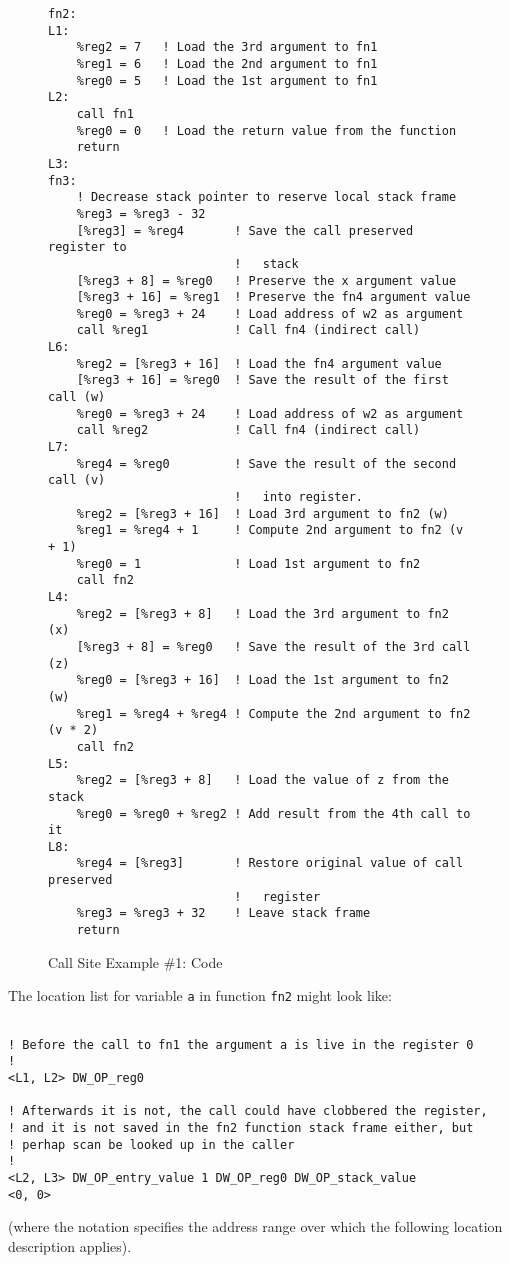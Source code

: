 \begin{figure}[ht]
\begin{lstlisting}
fn2:
L1:
    %reg2 = 7   ! Load the 3rd argument to fn1
    %reg1 = 6   ! Load the 2nd argument to fn1
    %reg0 = 5   ! Load the 1st argument to fn1
L2:
    call fn1
    %reg0 = 0   ! Load the return value from the function
    return
L3:
fn3:
    ! Decrease stack pointer to reserve local stack frame
    %reg3 = %reg3 - 32
    [%reg3] = %reg4       ! Save the call preserved register to
                          !   stack
    [%reg3 + 8] = %reg0   ! Preserve the x argument value
    [%reg3 + 16] = %reg1  ! Preserve the fn4 argument value
    %reg0 = %reg3 + 24    ! Load address of w2 as argument
    call %reg1            ! Call fn4 (indirect call)
L6:
    %reg2 = [%reg3 + 16]  ! Load the fn4 argument value
    [%reg3 + 16] = %reg0  ! Save the result of the first call (w)
    %reg0 = %reg3 + 24    ! Load address of w2 as argument
    call %reg2            ! Call fn4 (indirect call)
L7:
    %reg4 = %reg0         ! Save the result of the second call (v) 
                          !   into register.
    %reg2 = [%reg3 + 16]  ! Load 3rd argument to fn2 (w)
    %reg1 = %reg4 + 1     ! Compute 2nd argument to fn2 (v + 1)
    %reg0 = 1             ! Load 1st argument to fn2
    call fn2
L4:
    %reg2 = [%reg3 + 8]   ! Load the 3rd argument to fn2 (x)
    [%reg3 + 8] = %reg0   ! Save the result of the 3rd call (z)
    %reg0 = [%reg3 + 16]  ! Load the 1st argument to fn2 (w)
    %reg1 = %reg4 + %reg4 ! Compute the 2nd argument to fn2 (v * 2)
    call fn2
L5:
    %reg2 = [%reg3 + 8]   ! Load the value of z from the stack
    %reg0 = %reg0 + %reg2 ! Add result from the 4th call to it
L8:
    %reg4 = [%reg3]       ! Restore original value of call preserved 
                          !   register
    %reg3 = %reg3 + 32    ! Leave stack frame
    return
\end{lstlisting}
\caption{Call Site Example \#1: Code}
\label{fig:callsiteexample1code}
\end{figure}

\clearpage
The location list for variable \texttt{a} in function \texttt{fn2}
might look like:
\begin{lstlisting}

! Before the call to fn1 the argument a is live in the register 0
!
<L1, L2> DW_OP_reg0

! Afterwards it is not, the call could have clobbered the register,
! and it is not saved in the fn2 function stack frame either, but 
! perhap scan be looked up in the caller
!
<L2, L3> DW_OP_entry_value 1 DW_OP_reg0 DW_OP_stack_value
<0, 0>

\end{lstlisting}
(where the notation  specifies the address
range over which the following location description applies).

